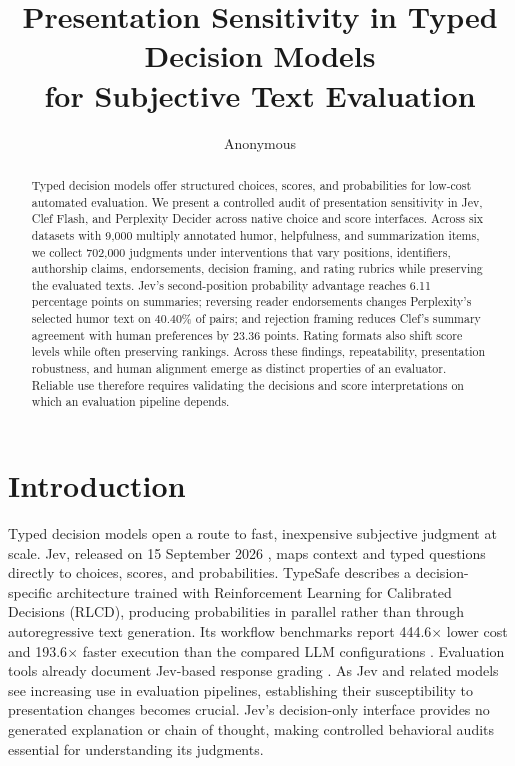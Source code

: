 \documentclass[11pt]{article}
\title{Presentation Sensitivity in Typed Decision Models\\for Subjective Text Evaluation}
\author{Anonymous}
\begin{document}
\maketitle
\begin{abstract}
Typed decision models offer structured choices, scores, and probabilities for low-cost automated evaluation. We present a controlled audit of presentation sensitivity in Jev, Clef Flash, and Perplexity Decider across native choice and score interfaces. Across six datasets with 9,000 multiply annotated humor, helpfulness, and summarization items, we collect 702,000 judgments under interventions that vary positions, identifiers, authorship claims, endorsements, decision framing, and rating rubrics while preserving the evaluated texts. Jev's second-position probability advantage reaches 6.11 percentage points on summaries; reversing reader endorsements changes Perplexity's selected humor text on 40.40\% of pairs; and rejection framing reduces Clef's summary agreement with human preferences by 23.36 points. Rating formats also shift score levels while often preserving rankings. Across these findings, repeatability, presentation robustness, and human alignment emerge as distinct properties of an evaluator. Reliable use therefore requires validating the decisions and score interpretations on which an evaluation pipeline depends.
\end{abstract}

\section{Introduction}
Typed decision models open a route to fast, inexpensive subjective judgment at scale. Jev, released on 15 September 2026 \citep{hardiman2026typesafe}, maps context and typed questions directly to choices, scores, and probabilities. TypeSafe describes a decision-specific architecture trained with Reinforcement Learning for Calibrated Decisions (RLCD), producing probabilities in parallel rather than through autoregressive text generation. Its workflow benchmarks report 444.6$\times$ lower cost and 193.6$\times$ faster execution than the compared LLM configurations \citep{almeida2026jev}. Evaluation tools already document Jev-based response grading \citep{honeyhive2026jev}. As Jev and related models see increasing use in evaluation pipelines, establishing their susceptibility to presentation changes becomes crucial. Jev's decision-only interface provides no generated explanation or chain of thought, making controlled behavioral audits essential for understanding its judgments.
\end{document}
